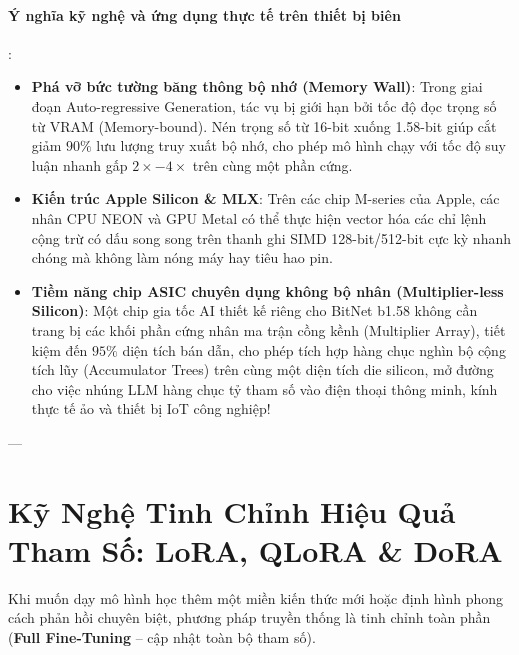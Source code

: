 \paragraph{Ý nghĩa kỹ nghệ và ứng dụng thực tế trên thiết bị biên}:
\begin{itemize}
  \item \textbf{Phá vỡ bức tường băng thông bộ nhớ (Memory Wall)}: Trong giai đoạn Auto-regressive Generation, tác vụ bị giới hạn bởi tốc độ đọc trọng số từ VRAM (Memory-bound). Nén trọng số từ 16-bit xuống 1.58-bit giúp cắt giảm $90\%$ lưu lượng truy xuất bộ nhớ, cho phép mô hình chạy với tốc độ suy luận nhanh gấp $2\times - 4\times$ trên cùng một phần cứng.
  \item \textbf{Kiến trúc Apple Silicon \& MLX}: Trên các chip M-series của Apple, các nhân CPU NEON và GPU Metal có thể thực hiện vector hóa các chỉ lệnh cộng trừ có dấu song song trên thanh ghi SIMD 128-bit/512-bit cực kỳ nhanh chóng mà không làm nóng máy hay tiêu hao pin.
  \item \textbf{Tiềm năng chip ASIC chuyên dụng không bộ nhân (Multiplier-less Silicon)}: Một chip gia tốc AI thiết kế riêng cho BitNet b1.58 không cần trang bị các khối phần cứng nhân ma trận cồng kềnh (Multiplier Array), tiết kiệm đến $95\%$ diện tích bán dẫn, cho phép tích hợp hàng chục nghìn bộ cộng tích lũy (Accumulator Trees) trên cùng một diện tích die silicon, mở đường cho việc nhúng LLM hàng chục tỷ tham số vào điện thoại thông minh, kính thực tế ảo và thiết bị IoT công nghiệp!
\end{itemize}

---

\section{Kỹ Nghệ Tinh Chỉnh Hiệu Quả Tham Số: LoRA, QLoRA \& DoRA}
\label{sec:peft-lora-qlora}

Khi muốn dạy mô hình học thêm một miền kiến thức mới hoặc định hình phong cách phản hồi chuyên biệt, phương pháp truyền thống là tinh chỉnh toàn phần (\textbf{Full Fine-Tuning} -- cập nhật toàn bộ tham số).

